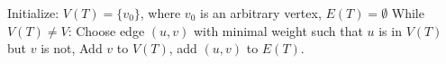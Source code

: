 \dontprintsemicolon
\BlankLine
Initialize: $V(T) = \{v_0\}$, where $v_0$ is an arbitrary vertex, $E(T)=\emptyset$\;
While $V(T)\not= V$:\;
{
\quad Choose edge $(u,v)$ with minimal weight such that $u$ is in $V(T)$
but $v$ is not,\;
\quad Add $v$ to $V(T)$, add $(u, v)$ to $E(T)$.\;
}

